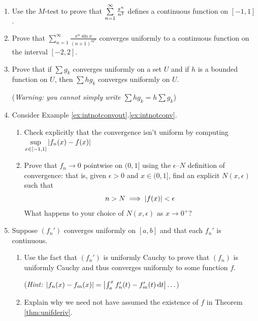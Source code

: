 \begin{exercises}
\begin{enumerate}
	  
		

		\item Use the $M$-test to prove that $\smash[b]{\sum\limits_{n=1}^\infty\frac{x^n}{n^2}}$ defines a continuous function on $[-1,1]$.
	  
	  
		\item Prove that $\sum\limits_{n=1}^\infty\frac{x^n\sin x}{(n+1)^32^n}$ converges uniformly to a continuous function on the interval $[-2,2]$.
	
	
		\item Prove that if $\sum g_k$ converges uniformly on a set $U$ and if $h$ is a bounded function on $U$, then $\sum hg_k$ converges uniformly on $U$.\par
	 	(\emph{Warning: you cannot simply write $\sum hg_k=h\sum g_k$})
	
	
	
	
		\item Consider Example \ref*{ex:intnotconvout}.\ref{ex:intnotconv}.
		\begin{enumerate}
		  \item Check explicitly that the convergence isn't uniform by computing $\sup\limits_{x\in[-1,1]}\left| f_n(x)-f(x)\right|$
		  \item Prove that $f_n\to 0$ pointwise on $(0,1]$ using the $\epsilon$--$N$ definition of convergence: that is, given $\epsilon>0$ and $x\in(0,1]$, find an explicit $N(x,\epsilon)$ such that
	  	\[
	  		n>N\implies \left| f(x)\right|<\epsilon
	  	\]
	  	What happens to your choice of $N(x,\epsilon)$ as $x\to 0^+$?
		\end{enumerate}
		
		
		\item\label{ex:derivunifconvtidy} Suppose $(f_n')$ converges uniformly on $[a,b]$ and that each $f_n'$ is continuous.
		\begin{enumerate}
		  \item Use the fact that $(f_n')$ is uniformly Cauchy to prove that $(f_n)$ is uniformly Cauchy and thus converges uniformly to some function $f$.\par
			(\emph{Hint: $\left| f_n(x)-f_m(x)\right|=\left| \int_a^xf_n'(t)-f_m'(t)\,{\mathrm{d} t}\right|\ldots$})
			\item Explain why we need not have assumed the existence of $f$ in Theorem \ref{thm:unifderiv}.
		\end{enumerate}
	\end{enumerate}
\end{exercises}



